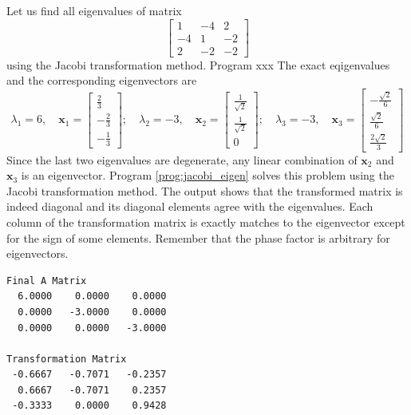 {\begin{example}
Let us find all eigenvalues of matrix
\begin{equation}
\begin{bmatrix}
 1 & -4 &  2 \\
-4 &  1 & -2 \\
 2 & -2 & -2 
\end{bmatrix}
\end{equation}
using the  Jacobi transformation method.  Program xxx 
The exact eqigenvalues and the corresponding eigenvectors are
\begin{equation}
\lambda_1=6, \quad \mathbf{x}_1 = \begin{bmatrix} \frac{2}{3} \\ -\frac{2}{3} \\ -\frac{1}{3} \end{bmatrix}; \quad
\lambda_2=-3, \quad \mathbf{x}_2 = \begin{bmatrix} \frac{1}{\sqrt{2}} \\ \frac{1}{\sqrt{2}} \\ 0 \end{bmatrix}; \quad
\lambda_3=-3, \quad \mathbf{x}_3 = \begin{bmatrix} -\frac{\sqrt{2}}{6} \\ \frac{\sqrt{2}}{6} \\ \frac{2\sqrt{2}}{3} \end{bmatrix}
\end{equation}
Since the last two eigenvalues are degenerate, any linear combination of $\mathbf{x}_2$ and $\mathbf{x}_3$ is an eigenvector.
Program \ref{prog:jacobi_eigen} solves this problem using the Jacobi transformation method.  The output shows that the transformed matrix is indeed diagonal and its diagonal elements agree with the eigenvalues.  Each column of the transformation matrix is exactly matches to the eigenvector except for the sign of some elements.  Remember that the phase factor is arbitrary for eigenvectors.

\begin{center}
\begin{minipage}{3in}
\small
\begin{Verbatim}[frame=single]
Final A Matrix 
  6.0000    0.0000    0.0000
  0.0000   -3.0000    0.0000
  0.0000    0.0000   -3.0000

Transformation Matrix
 -0.6667   -0.7071   -0.2357
  0.6667   -0.7071    0.2357
 -0.3333    0.0000    0.9428
\end{Verbatim}
\normalsize
\end{minipage}
\end{center}
 

\end{example}}
